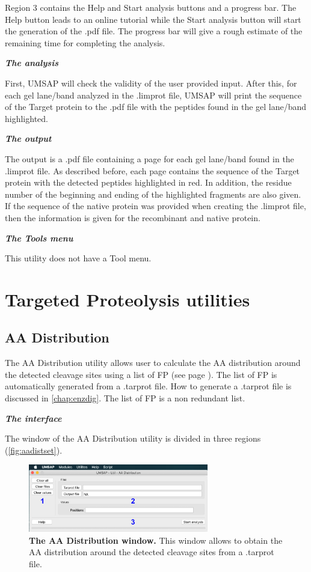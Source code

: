 Region \num{3} contains the Help and Start analysis buttons and a progress bar. The Help button leads to an online tutorial while the Start analysis button will start the generation of the .pdf file. The progress bar will give a rough estimate of the remaining time for completing the analysis.

\textit{\textbf{The analysis}}

First, UMSAP will check the validity of the user provided input. After this, for each gel lane/band analyzed in the .limprot file, UMSAP will print the sequence of the Target protein to the .pdf file with the peptides found in the gel lane/band highlighted.

\textit{\textbf{The output}} 

The output is a .pdf file containing a page for each gel lane/band found in the .limprot file. As described before, each page contains the sequence of the Target protein with the detected peptides highlighted in red. In addition, the residue number of the beginning and ending of the highlighted fragments are also given. If the sequence of the native protein was provided when creating the .limprot file, then the information is given for the recombinant and native protein. 

\textit{\textbf{The Tools menu}}

This utility does not have a Tool menu.

\section{Targeted Proteolysis utilities }  

\subsection{AA Distribution}
\label{subsec:aadistcalc}
The AA Distribution utility allows user to calculate the AA distribution around the detected cleavage sites using a list of FP (see page \pageref{par:PIP}). The list of FP is automatically generated from a .tarprot file. How to generate a .tarprot file is discussed in \autoref{chap:enzdig}. The list of FP is a non redundant list. 

\textit{\textbf{The interface}}

The window of the AA Distribution utility is divided in three regions (\autoref{fig:aadistset}).

\begin{figure}[h]
	\centering
	\includegraphics[width=0.7\textwidth]{./IMAGES/UTIL-AA-WINDOW/util-aa.jpg}	    
	\caption[The AA Distribution window]{\textbf{The AA Distribution window.} This window allows to obtain the AA distribution around the detected cleavage sites from a .tarprot file.} 
	\label{fig:aadistset}
	\vspace{-5pt} 	
\end{figure}

